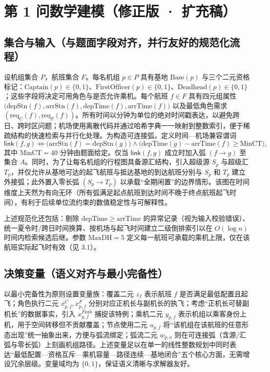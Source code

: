 \documentclass{article}
\begin{document}
\section*{第 1 问数学建模（修正版 · 扩充稿）}

\subsection{集合与输入（与题面字段对齐，并行友好的规范化流程）}
设机组集合 $P$，航班集合 $F$。每名机组 $p \in P$ 具有基地 $\mathrm{Base}(p)$ 与三个二元资格标记：$\mathrm{Captain}(p) \in \{0,1\}$、$\mathrm{FirstOfficer}(p) \in \{0,1\}$、$\mathrm{Deadhead}(p) \in \{0,1\}$；这些字段将决定可用角色与是否允许乘机。每个航班 $f \in F$ 具有四元组属性 $\big(\mathrm{depStn}(f),\mathrm{arrStn}(f),\mathrm{depTime}(f),\mathrm{arrTime}(f)\big)$ 以及最低角色需求 $(\mathrm{req}_C(f),\mathrm{req}_F(f))$。所有时间以分钟为单位的绝对时间戳表达，以避免跨日、跨时区问题；机场使用离散代码并通过哈希字典一一映射到整数索引，便于稀疏结构的快速检索与并行化处理。为构造可连接弧，定义时间—机场兼容谓词
\begin{equation}
\mathsf{link}(f,g) \iff \big(\mathrm{arrStn}(f)=\mathrm{depStn}(g)\big) \land \big(\mathrm{depTime}(g)-\mathrm{arrTime}(f)\ge \mathrm{MinCT}\big),
\end{equation}
其中 $\mathrm{MinCT}=40$ 分钟由题面给定。仅当 $\mathsf{link}(f,g)$ 成立时加入弧 $(f \to g)$ 至集合 $A$。同时，为了让每名机组的行程图具备源汇结构，引入超级源 $S_p$ 与超级汇 $T_p$，并仅允许从基地可达的起飞航班与抵达基地的到达航班分别与 $S_p$ 和 $T_p$ 建立外接弧；此外置入零长弧 $(S_p \to T_p)$ 以承载“全期闲置”的边界情形。该图在时间维度上天然为有向无环（所有弧满足起点航班到达时间不晚于终点航班起飞时间），有利于后续单位流约束的数值稳定性与可解释性。
\par
上述规范化还包括：剔除 $\mathrm{depTime} \ge \mathrm{arrTime}$ 的异常记录（视为输入校验错误）、统一夏令时/跨日时间换算、按机场与起飞时间建立二级倒排索引以在 $O(\log n)$ 时间内检索候选后继。参数 $\mathrm{MaxDH}=5$ 定义每一航班可承载的乘机上限，仅在该航班实际起飞时有效（见 3.1）。

\subsection{决策变量（语义对齐与最小完备性）}
以最小完备性为原则设置变量族：覆盖二元 $z_f$ 表示航班 $f$ 是否满足最低配置且起飞；角色执行二元 $x^{C}_{p,f}, x^{F}_{p,f}$ 分别对应正机长与副机长的执飞；考虑“正机长可替副机长”的数据事实，引入 $x^{F\text{sub}}_{p,f}$ 捕捉该特例；乘机二元 $y_{p,f}$ 表示机组以乘客身份上机，用于空间转移但不贡献覆盖；节点使用二元 $u_{p,f}$ 将“该机组在该航班的任意形态出现”统一抽象出来，方便与弧流绑定；弧流二元 $w_{p,a}$ 则在可连接弧（含源/汇弧与零长弧）上刻画机组路径。上述变量足以在单一的线性整数规划中同时表达“最低配置—资格互斥—乘机容量—路径连续—基地闭合”五个核心方面，无需增设冗余层级。变量域均为 $\{0,1\}$，保证语义清晰与求解器友好。
\end{document}

